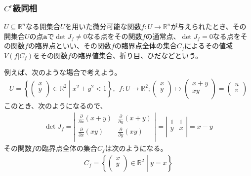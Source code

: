 \documentclass[dvipdfmx]{jsarticle}
\begin{document}
\subsubsection{$C^{r}$級同相}%
\begin{dfn}
$U \subseteq \mathbb{R}^{n}$なる開集合$U$を用いた微分可能な関数$f:U \rightarrow \mathbb{R}^{n}$が与えられたとき、その開集合$U$の点$\mathbf{a}$で$\det J_{f} \neq 0$なる点をその関数$f$の通常点、$\det J_{f} = 0$なる点をその関数$f$の臨界点といい、その関数$f$の臨界点全体の集合$C_{f}$によるその値域$V\left( f|C_{f} \right)$をその関数$f$の臨界値集合、折り目、ひだなどという。
\end{dfn}\par
例えば、次のような場合で考えよう。
\begin{align*}
U = \left\{ \begin{pmatrix}
x \\
y \\
\end{pmatrix} \in \mathbb{R}^{2} \middle| x^{2} + y^{2} < 1 \right\},\ \ f:U \rightarrow \mathbb{R}^{2};\begin{pmatrix}
x \\
y \\
\end{pmatrix} \mapsto \begin{pmatrix}
x + y \\
xy \\
\end{pmatrix} = \begin{pmatrix}
u \\
v \\
\end{pmatrix}
\end{align*}
このとき、次のようになるので、
\begin{align*}
\det J_{f} = \left| \begin{matrix}
\frac{\partial}{\partial x}(x + y) & \frac{\partial}{\partial y}(x + y) \\
\frac{\partial}{\partial x}(xy) & \frac{\partial}{\partial y}(xy) \\
\end{matrix} \right| = \left| \begin{matrix}
1 & 1 \\
y & x \\
\end{matrix} \right| = x - y
\end{align*}
その関数$f$の臨界点全体の集合$C_{f}$は次のようになる。
\begin{align*}
C_{f} = \left\{ \begin{pmatrix}
x \\
y \\
\end{pmatrix} \in \mathbb{R}^{2} \middle| y = x \right\}
\end{align*}
\end{document}
